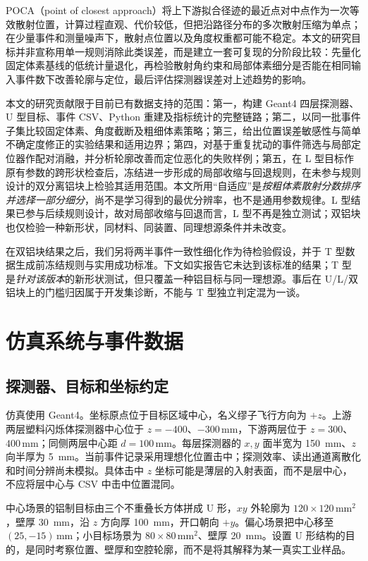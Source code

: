 \documentclass[UTF8,fontset=none,zihao=-4,a4paper]{ctexart}
\begin{document}
POCA（point of closest approach）将上下游拟合径迹的最近点对中点作为一次等效散射位置，计算过程直观、代价较低，但把沿路径分布的多次散射压缩为单点；在少量事件和测量噪声下，散射点位置以及角度权重都可能不稳定。本文的研究目标并非宣称用单一规则消除此类误差，而是建立一套可复现的分阶段比较：先量化固定体素基线的低统计量退化，再检验散射角约束和局部体素细分是否能在相同输入事件数下改善轮廓与定位，最后评估探测器误差对上述趋势的影响。

本文的研究贡献限于目前已有数据支持的范围：第一，构建 Geant4 四层探测器、U 型目标、事件 CSV、Python 重建及指标统计的完整链路；第二，以同一批事件子集比较固定体素、角度截断及粗细体素策略；第三，给出位置误差敏感性与简单不确定度修正的实验结果和适用边界；第四，对基于重复扰动的事件筛选与局部定位器作配对消融，并分析轮廓改善而定位恶化的失败样例；第五，在 L 型目标作原有参数的跨形状检查后，冻结进一步形成的局部收缩与回退规则，在未参与规则设计的双分离铝块上检验其适用范围。本文所用“自适应”是\emph{按粗体素散射分数排序并选择一部分细分}，尚不是学习得到的最优分辨率，也不是通用参数规律。L 型结果已参与后续规则设计，故对局部收缩与回退而言，L 型不再是独立测试；双铝块也仅检验一种新形状，同材料、同装置、同理想源条件并未改变。

在双铝块结果之后，我们另将两半事件一致性细化作为待检验假设，并于 T 型数据生成前冻结规则与实用成功标准。下文如实报告它未达到该标准的结果；T 型是\emph{针对该版本}的新形状测试，但只覆盖一种铝目标与同一理想源。事后在 U/L/双铝块上的门槛归因属于开发集诊断，不能与 T 型独立判定混为一谈。

\section{仿真系统与事件数据}
\subsection{探测器、目标和坐标约定}
仿真使用 Geant4\cite{agostinelli2003}。坐标原点位于目标区域中心，名义缪子飞行方向为 $+z$。上游两层塑料闪烁体探测器中心位于 $z=-400$、$-300$\,mm，下游两层位于 $z=300$、$400$\,mm；同侧两层中心距 $d=100$\,mm。每层探测器的 $x,y$ 面半宽为 \SI{150}{mm}、$z$ 向半厚为 \SI{5}{mm}。当前事件记录采用理想化位置击中；探测效率、读出通道离散化和时间分辨尚未模拟。具体击中 $z$ 坐标可能是薄层的入射表面，而不是层中心，不应将层中心与 CSV 中击中位置混同。

中心场景的铝制目标由三个不重叠长方体拼成 U 形，$xy$ 外轮廓为 $120\times120$\,mm$^2$，壁厚 \SI{30}{mm}，沿 $z$ 方向厚 \SI{100}{mm}，开口朝向 $+y$。偏心场景把中心移至 $(25,-15)$\,mm；小目标场景为 $80\times80$\,mm$^2$、壁厚 \SI{20}{mm}。设置 U 形结构的目的，是同时考察位置、壁厚和空腔轮廓，而不是将其解释为某一真实工业样品。
\end{document}
